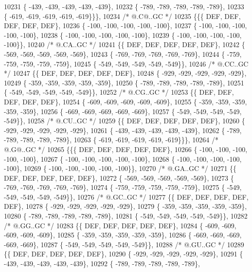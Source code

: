 \begin{DoxyCode}
10231 \{ -439, -439, -439, -439, -439\},
10232 \{ -789, -789, -789, -789, -789\},
10233 \{ -619, -619, -619, -619, -619\}\}\},
10234 \textcolor{comment}{/*  @.C@..GC */}
10235 \{\{\{  DEF,  DEF,  DEF,  DEF,  DEF\},
10236 \{ -100, -100, -100, -100, -100\},
10237 \{ -100, -100, -100, -100, -100\},
10238 \{ -100, -100, -100, -100, -100\},
10239 \{ -100, -100, -100, -100, -100\}\},
10240 \textcolor{comment}{/*  @.CA..GC */}
10241 \{\{  DEF,  DEF,  DEF,  DEF,  DEF\},
10242 \{ -569, -569, -569, -569, -569\},
10243 \{ -769, -769, -769, -769, -769\},
10244 \{ -759, -759, -759, -759, -759\},
10245 \{ -549, -549, -549, -549, -549\}\},
10246 \textcolor{comment}{/*  @.CC..GC */}
10247 \{\{  DEF,  DEF,  DEF,  DEF,  DEF\},
10248 \{ -929, -929, -929, -929, -929\},
10249 \{ -359, -359, -359, -359, -359\},
10250 \{ -789, -789, -789, -789, -789\},
10251 \{ -549, -549, -549, -549, -549\}\},
10252 \textcolor{comment}{/*  @.CG..GC */}
10253 \{\{  DEF,  DEF,  DEF,  DEF,  DEF\},
10254 \{ -609, -609, -609, -609, -609\},
10255 \{ -359, -359, -359, -359, -359\},
10256 \{ -669, -669, -669, -669, -669\},
10257 \{ -549, -549, -549, -549, -549\}\},
10258 \textcolor{comment}{/*  @.CU..GC */}
10259 \{\{  DEF,  DEF,  DEF,  DEF,  DEF\},
10260 \{ -929, -929, -929, -929, -929\},
10261 \{ -439, -439, -439, -439, -439\},
10262 \{ -789, -789, -789, -789, -789\},
10263 \{ -619, -619, -619, -619, -619\}\}\},
10264 \textcolor{comment}{/*  @.G@..GC */}
10265 \{\{\{  DEF,  DEF,  DEF,  DEF,  DEF\},
10266 \{ -100, -100, -100, -100, -100\},
10267 \{ -100, -100, -100, -100, -100\},
10268 \{ -100, -100, -100, -100, -100\},
10269 \{ -100, -100, -100, -100, -100\}\},
10270 \textcolor{comment}{/*  @.GA..GC */}
10271 \{\{  DEF,  DEF,  DEF,  DEF,  DEF\},
10272 \{ -569, -569, -569, -569, -569\},
10273 \{ -769, -769, -769, -769, -769\},
10274 \{ -759, -759, -759, -759, -759\},
10275 \{ -549, -549, -549, -549, -549\}\},
10276 \textcolor{comment}{/*  @.GC..GC */}
10277 \{\{  DEF,  DEF,  DEF,  DEF,  DEF\},
10278 \{ -929, -929, -929, -929, -929\},
10279 \{ -359, -359, -359, -359, -359\},
10280 \{ -789, -789, -789, -789, -789\},
10281 \{ -549, -549, -549, -549, -549\}\},
10282 \textcolor{comment}{/*  @.GG..GC */}
10283 \{\{  DEF,  DEF,  DEF,  DEF,  DEF\},
10284 \{ -609, -609, -609, -609, -609\},
10285 \{ -359, -359, -359, -359, -359\},
10286 \{ -669, -669, -669, -669, -669\},
10287 \{ -549, -549, -549, -549, -549\}\},
10288 \textcolor{comment}{/*  @.GU..GC */}
10289 \{\{  DEF,  DEF,  DEF,  DEF,  DEF\},
10290 \{ -929, -929, -929, -929, -929\},
10291 \{ -439, -439, -439, -439, -439\},
10292 \{ -789, -789, -789, -789, -789\},

\end{DoxyCode}
